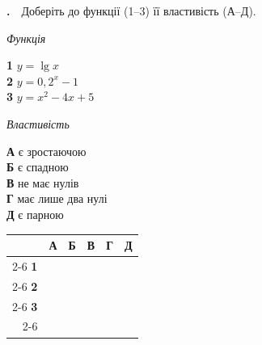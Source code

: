 \documentclass[12pt]{article}
\newcommand{\matchingGrid}{%
    \begingroup
    \renewcommand{\arraystretch}{1.15}
    \setlength{\tabcolsep}{4pt}
    \footnotesize
    \begin{tabular}{r|c|c|c|c|c|}
         \multicolumn{1}{c}{} & \multicolumn{1}{c}{\textbf{А}} & \multicolumn{1}{c}{\textbf{Б}} & \multicolumn{1}{c}{\textbf{В}} & \multicolumn{1}{c}{\textbf{Г}} & \multicolumn{1}{c}{\textbf{Д}} \\ \cline{2-6}
         \textbf{1} & \phantom{X} & \phantom{X} & \phantom{X} & \phantom{X} & \phantom{X} \\ \cline{2-6}
         \textbf{2} & & & & & \\ \cline{2-6}
         \textbf{3} & & & & & \\ \cline{2-6}
    \end{tabular}
    \endgroup
}
\newcounter{zad}
\newcommand{\zadtask}[1]{\stepcounter{zad}\noindent\textbf{\thezad.}\ \ #1\par\vspace{0.2cm}}
\begin{document}
\zadtask{Доберіть до функції (1--3) її властивість (А--Д).
\vspace{0.3cm}
\noindent
\begin{minipage}[t]{0.45\textwidth}
\textit{Функція}\par\vspace{0.15cm}
\textbf{1} \quad $y = \lg x$\\[0.25cm]
\textbf{2} \quad $y = 0{,}2^x - 1$\\[0.25cm]
\textbf{3} \quad $y = x^2 - 4x + 5$
\end{minipage}
\hfill
\begin{minipage}[t]{0.3\textwidth}
\textit{Властивість}\par\vspace{0.15cm}
\textbf{А} \quad є зростаючою\\[0.15cm]
\textbf{Б} \quad є спадною\\[0.15cm]
\textbf{В} \quad не має нулів\\[0.15cm]
\textbf{Г} \quad має лише два нулі\\[0.15cm]
\textbf{Д} \quad є парною
\end{minipage}
\hfill
\begin{minipage}[t]{0.2\textwidth}
\vspace{0.4cm}
\begin{flushright}\matchingGrid\end{flushright}
\end{minipage}}
\end{document}
